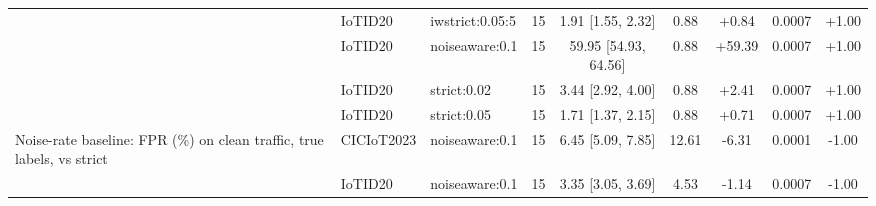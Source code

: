 \begin{table}[t]
\begin{tabular}{lllcccccc}
 & IoTID20 & iwstrict:0.05:5 & 15 & 1.91 [1.55, 2.32] & 0.88 & +0.84 & 0.0007 & +1.00 \\
 & IoTID20 & noiseaware:0.1 & 15 & 59.95 [54.93, 64.56] & 0.88 & +59.39 & 0.0007 & +1.00 \\
 & IoTID20 & strict:0.02 & 15 & 3.44 [2.92, 4.00] & 0.88 & +2.41 & 0.0007 & +1.00 \\
 & IoTID20 & strict:0.05 & 15 & 1.71 [1.37, 2.15] & 0.88 & +0.71 & 0.0007 & +1.00 \\
Noise-rate baseline: FPR (\%) on clean traffic, true labels, vs strict & CICIoT2023 & noiseaware:0.1 & 15 & 6.45 [5.09, 7.85] & 12.61 & -6.31 & 0.0001 & -1.00 \\
 & IoTID20 & noiseaware:0.1 & 15 & 3.35 [3.05, 3.69] & 4.53 & -1.14 & 0.0007 & -1.00 \\
\bottomrule
\end{tabular}
\end{table}
